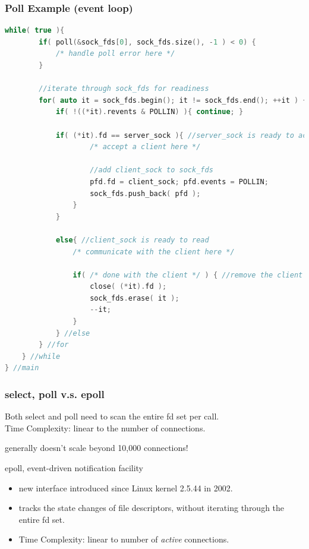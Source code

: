 \documentclass[aspectratio=43]{beamer}
\begin{document}
\begin{frame}[fragile]
  \frametitle{Poll Example (event loop)}
\begin{lstlisting}[language=C++,basicstyle=\ttfamily\tiny,commentstyle=\color{commgreen},keywordstyle=\color{blue},breaklines=true]
    while( true ){  
        if( poll(&sock_fds[0], sock_fds.size(), -1 ) < 0) {
            /* handle poll error here */
        }
    
        //iterate through sock_fds for readiness
        for( auto it = sock_fds.begin(); it != sock_fds.end(); ++it ) {            
            if( !((*it).revents & POLLIN) ){ continue; }

            if( (*it).fd == server_sock ){ //server_sock is ready to accept
                    /* accept a client here */
                    
                    //add client_sock to sock_fds
                    pfd.fd = client_sock; pfd.events = POLLIN;
                    sock_fds.push_back( pfd );
                }       
            }

            else{ //client_sock is ready to read
                /* communicate with the client here */
                
                if( /* done with the client */ ) { //remove the client from poll queue
                    close( (*it).fd );
                    sock_fds.erase( it );
                    --it;
                }
            } //else
        } //for
    } //while
} //main

\end{lstlisting}
\end{frame}

\begin{frame}[fragile]
  \frametitle{select, poll v.s. epoll}
  
     Both select and poll need to scan the entire fd set per call.\\
     Time Complexity: linear to the number of connections.\\
     \begin{center}
     \large generally doesn't scale beyond 10,000 connections!
     \end{center}
     
     epoll, event-driven notification facility
     \begin{itemize}
     \item new interface introduced since Linux kernel 2.5.44 in 2002.
     \item tracks the state changes of file descriptors, without iterating through the entire fd set.
     \item Time Complexity: linear to number of \emph{active} connections.
     \end{itemize}
\end{frame}
\end{document}
